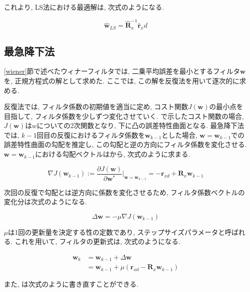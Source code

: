 これより, LS法における最適解は, 次式のようになる\cite{signal_processing_for_array}. 

\begin{equation}
\hat{\bm{w}}_{LS} = \hat{\bm{R}}_x^{-1} \hat{\bm{r}}_xd
\end{equation}

\subsection{最急降下法}\label{sd}

\ref{wiener}節で述べたウィナーフィルタでは, 二乗平均誤差を最小とするフィルタ\(\bm{w}\)を, 正規方程式の解として求めた. ここでは, この解を反復法を用いて逐次的に求める. 

反復法では, フィルタ係数の初期値を適当に定め, コスト関数\(J(\bm{w})\)の最小点を目指して, フィルタ係数を少しずつ変化させていく. で示したコスト関数の場合, \(J(\bm{w})\)は\(w\)についての2次関数となり, 下に凸の誤差特性曲面となる. 最急降下法では, \(k-1\)回目の反復におけるフィルタ係数を\(\bm{w}_{k-1}\)とした場合, \(\bm{w} = \bm{w}_{k-1}\)での誤差特性曲面の勾配を推定し, この勾配と逆の方向にフィルタ係数を変化させる. \(\bm{w} = \bm{w}_{k-1}\)における勾配ベクトルはから, 次式のように求まる. 

\begin{equation}
\nabla J(\bm{w}_{k-1}) := \frac{\partial J(\bm{w})}{\partial \bm{w}^*} |_{\bm{w} = \bm{w}_{k-1}} = - \bm{r}_{xd} + \bm{R}_x \bm{w}_{k-1}
\end{equation}

次回の反復で勾配とは逆方向に係数を変化させるため, フィルタ係数ベクトルの変化分は次式のようになる. 

\begin{equation}
\Delta \bm{w} = - \mu \nabla J(\bm{w}_{k-1})
\end{equation}

\(\mu\)は1回の更新量を決定する性の定数であり, ステップサイズパラメータと呼ばれる. これを用いて, フィルタの更新式は, 次式のようになる. 

\begin{equation}
\begin{split}
\bm{w}_k &= \bm{w}_{k-1} + \Delta \bm{w} \\
         &= \bm{w}_{k-1} + \mu (\bm{r}_{xd} - \bm{R}_x \bm{w}_{k-1})
\end{split}
\label{equ:w_delta}
\end{equation}

また, は次式のように書き直すことができる. 

